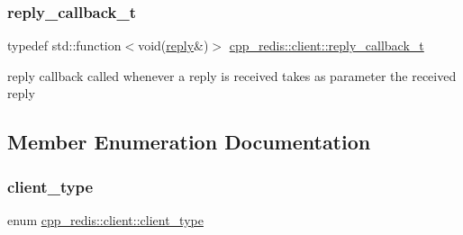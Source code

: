 \subsubsection{\texorpdfstring{reply\+\_\+callback\+\_\+t}{reply\_callback\_t}}
{\footnotesize\ttfamily typedef std\+::function$<$void(\hyperlink{classcpp__redis_1_1reply}{reply}\&)$>$ \hyperlink{classcpp__redis_1_1client_a061a1140d36d2eaeda82b09a0bb3f9f2}{cpp\+\_\+redis\+::client\+::reply\+\_\+callback\+\_\+t}}

reply callback called whenever a reply is received takes as parameter the received reply 

\subsection{Member Enumeration Documentation}
\mbox{\label{classcpp__redis_1_1client_a388877b01b4e045cddb138e70a68e000}} 
\subsubsection{\texorpdfstring{client\+\_\+type}{client\_type}}
{\footnotesize\ttfamily enum \hyperlink{classcpp__redis_1_1client_a388877b01b4e045cddb138e70a68e000}{cpp\+\_\+redis\+::client\+::client\+\_\+type}\hspace{0.3cm}{\ttfamily [strong]}}

